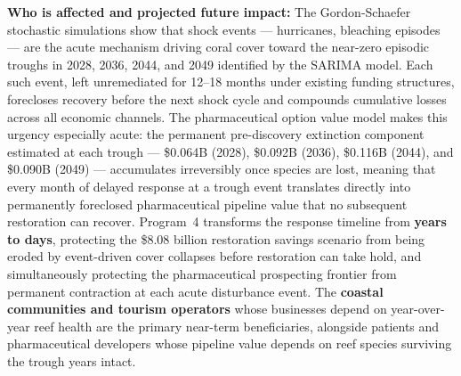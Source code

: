 \documentclass[10pt,letterpaper]{article}
\newcounter{gs}
\begin{document}
\begin{tcolorbox}[title=Program 4: National Reef Insurance Reserve --- \$8M Annual Total,
  colback=red!5, colframe=red!50!black, fonttitle=\bfseries, breakable]
  \medskip
  \textbf{Who is affected and projected future impact:} The Gordon-Schaefer stochastic
  simulations show that shock events --- hurricanes, bleaching episodes --- are the acute
  mechanism driving coral cover toward the near-zero episodic troughs in 2028, 2036, 2044, and
  2049 identified by the SARIMA model. Each such event, left unremediated for 12--18 months
  under existing funding structures, forecloses recovery before the next shock cycle and
  compounds cumulative losses across all economic channels. The pharmaceutical option value
  model makes this urgency especially acute: the permanent pre-discovery extinction component
  estimated at each trough --- \$0.064B (2028), \$0.092B (2036), \$0.116B (2044), and
  \$0.090B (2049) --- accumulates irreversibly once species are lost, meaning that every month
  of delayed response at a trough event translates directly into permanently foreclosed
  pharmaceutical pipeline value that no subsequent restoration can recover. Program~4 transforms
  the response timeline from \textbf{years to days}, protecting the \$8.08 billion restoration
  savings scenario from being eroded by event-driven cover collapses before restoration can take
  hold, and simultaneously protecting the pharmaceutical prospecting frontier from permanent
  contraction at each acute disturbance event. The \textbf{coastal communities and tourism
  operators} whose businesses depend on year-over-year reef health are the primary near-term
  beneficiaries, alongside patients and pharmaceutical developers whose pipeline value depends
  on reef species surviving the trough years intact.
\end{tcolorbox}

\medskip
\end{document}
